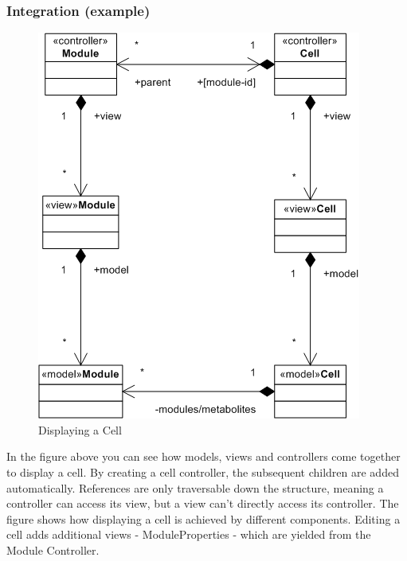\documentclass{report}
\begin{document}
				\subsubsection{Integration (example)}
					\begin{figure}[htb]
						\begin{center}
							\includegraphics[width=\linewidth]{cell_struct.png}
							\caption{Displaying a Cell}
							\label{fig: cellstruct}
						\end{center}
					\end{figure}	
					In the figure above you can see how models, views and controllers come together to display a cell. By creating a cell controller, the subsequent children are added automatically. References are only traversable down the structure, meaning a controller can access its view, but a view can't directly access its controller. The figure shows how displaying a cell is achieved by different components. Editing a cell adds additional views - ModuleProperties - which are yielded from the Module Controller. \\
					
\end{document}
